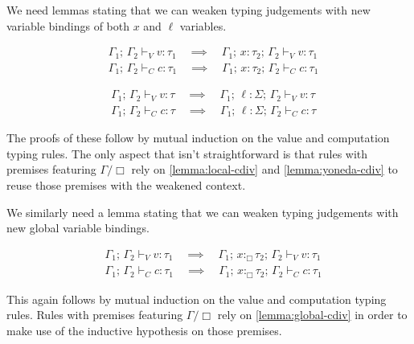 \documentclass[acmsmall, screen, review, anonymous]{acmart}
\theoremstyle{definition}
\newcommand{\loc}{\ell}
\newcommand{\types}{\mathrel{:}}
\newcommand{\gtypes}{\mathrel{:_{\Box}}}
\newcommand{\ccons}[2]{#1;\,#2}
\newcommand{\lbind}[3]{\ccons{#1}{#2\types#3}}
\newcommand{\gbind}[3]{\ccons{#1}{#2\gtypes#3}}
\newcommand{\cdiv}[1]{#1/\Box}
\newcommand{\turnv}{\mathrel{\vdash_V}}
\newcommand{\turnc}{\mathrel{\vdash_C}}
\begin{document}
We need lemmas stating that we can weaken typing judgements with new
variable bindings of both $x$ and $\loc$ variables.
\begin{lemma}
\label{lemma:local-weakening}
  \begin{align*}
    &\ccons{\Gamma_1}{\Gamma_2} \turnv v \types \tau_1
    \quad \implies \quad \ccons{\lbind{\Gamma_1}{x}{\tau_2}}{\Gamma_2} \turnv v \types \tau_1 \\
    &\ccons{\Gamma_1}{\Gamma_2} \turnc c \types \tau_1
    \quad \implies \quad \ccons{\lbind{\Gamma_1}{x}{\tau_2}}{\Gamma_2} \turnc c \types \tau_1
  \end{align*}
\end{lemma}
\begin{lemma}
\label{lemma:yoneda-weakening}
  \begin{align*}
    &\ccons{\Gamma_1}{\Gamma_2} \turnv v \types \tau
    \quad \implies \quad \ccons{\lbind{\Gamma_1}{\loc}{\Sigma}}{\Gamma_2} \turnv v \types \tau \\
    &\ccons{\Gamma_1}{\Gamma_2} \turnc c \types \tau
    \quad \implies \quad \ccons{\lbind{\Gamma_1}{\loc}{\Sigma}}{\Gamma_2} \turnc c \types \tau
  \end{align*}
\end{lemma}
The proofs of these follow by mutual induction on the value and
computation typing rules. The only aspect that isn't straightforward is
that rules with premises featuring $\cdiv{\Gamma}$ rely on
\ref{lemma:local-cdiv} and \ref{lemma:yoneda-cdiv} to reuse those
premises with the weakened context.

We similarly need a lemma stating that we can weaken typing
judgements with new global variable bindings.
\begin{lemma}
\label{lemma:global-weakening}
  \begin{align*}
    &\ccons{\Gamma_1}{\Gamma_2} \turnv v \types \tau_1
    \quad \implies \quad \ccons{\gbind{\Gamma_1}{x}{\tau_2}}{\Gamma_2} \turnv v \types \tau_1 \\
    &\ccons{\Gamma_1}{\Gamma_2} \turnc c \types \tau_1
    \quad \implies \quad \ccons{\gbind{\Gamma_1}{x}{\tau_2}}{\Gamma_2} \turnc c \types \tau_1
  \end{align*}
\end{lemma}
This again follows by mutual induction on the value and computation
typing rules. Rules with premises featuring $\cdiv{\Gamma}$ rely on
\ref{lemma:global-cdiv} in order to make use of the inductive hypothesis
on those premises.
\end{document}
